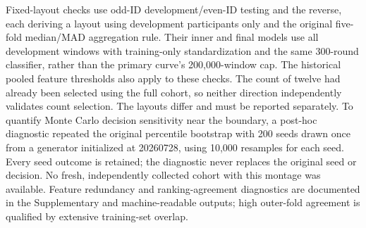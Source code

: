 Fixed-layout checks use odd-ID development/even-ID testing and the reverse, each deriving a layout using development participants only and the original five-fold median/MAD aggregation rule. Their inner and final models use all development windows with training-only standardization and the same 300-round classifier, rather than the primary curve's 200,000-window cap. The historical pooled feature thresholds also apply to these checks. The count of twelve had already been selected using the full cohort, so neither direction independently validates count selection. The layouts differ and must be reported separately. To quantify Monte Carlo decision sensitivity near the boundary, a post-hoc diagnostic repeated the original percentile bootstrap with 200 seeds drawn once from a generator initialized at 20260728, using 10,000 resamples for each seed. Every seed outcome is retained; the diagnostic never replaces the original seed or decision. No fresh, independently collected cohort with this montage was available. Feature redundancy and ranking-agreement diagnostics are documented in the Supplementary and machine-readable outputs; high outer-fold agreement is qualified by extensive training-set overlap.
